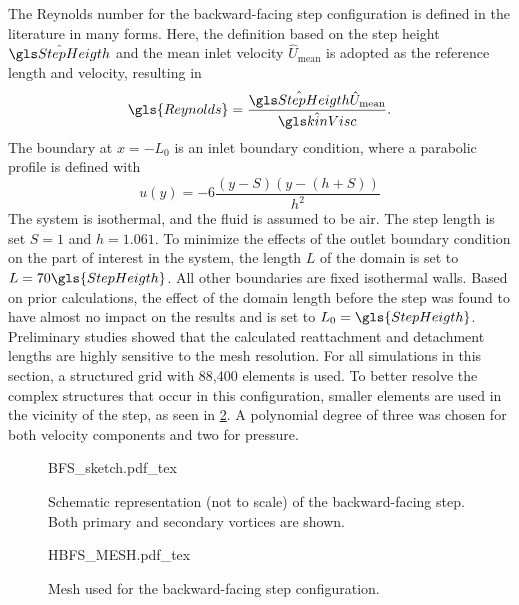 The Reynolds number for the backward-facing step configuration is defined in the literature in many forms. Here, the definition based on the step height $\glsHat{StepHeigth}$ and the mean inlet velocity $\hat U_{\text{mean}}$ is adopted as the reference length and velocity, resulting in
\begin{equation}
	\gls{Reynolds}= \frac{\glsHat{StepHeigth}\hat U_{\text{mean}}}{\glsHat{kinVisc}}.
\end{equation}
The boundary at $x = - L_0$ is an inlet boundary condition, where a parabolic profile is defined with %
\begin{equation}
	u(y) = -6\frac{( y- S)( y-( h+ S))}{h^2} %
\end{equation}
The system is isothermal, and the fluid is assumed to be air. The step length is set $S=1$ and $h = 1.061$. To minimize the effects of the outlet boundary condition on the part of interest in the system, the length $L$ of the domain is set to $L = 70 \gls{StepHeigth}$. All other boundaries are fixed isothermal walls. Based on prior calculations, the effect of the domain length before the step was found to have almost no impact on the results and is set to $L_0 = \gls{StepHeigth}$. Preliminary studies showed that the calculated reattachment and detachment lengths are highly sensitive to the mesh resolution. For all simulations in this section, a structured grid with 88,400 elements is used. To better resolve the complex structures that occur in this configuration, smaller elements are used in the vicinity of the step, as seen in \cref{bfsmesh}.  A polynomial degree of three was chosen for both velocity components and two for pressure.

\begin{figure}[tb]
	\begin{center}
		\def\svgwidth{0.9\textwidth}
		{BFS_sketch.pdf_tex}
		\caption[Schematic representation of the backward-facing step.]{Schematic representation (not to scale) of the backward-facing step. Both primary and secondary vortices are shown.}
		\label{BFSsketch}
	\end{center}
\end{figure}

\begin{figure}[tb]
	\begin{center}
		\def\svgwidth{0.8\textwidth}
		{HBFS_MESH.pdf_tex}
		\caption{Mesh used for the backward-facing step configuration.}
		\label{bfsmesh}
	\end{center}
\end{figure}

